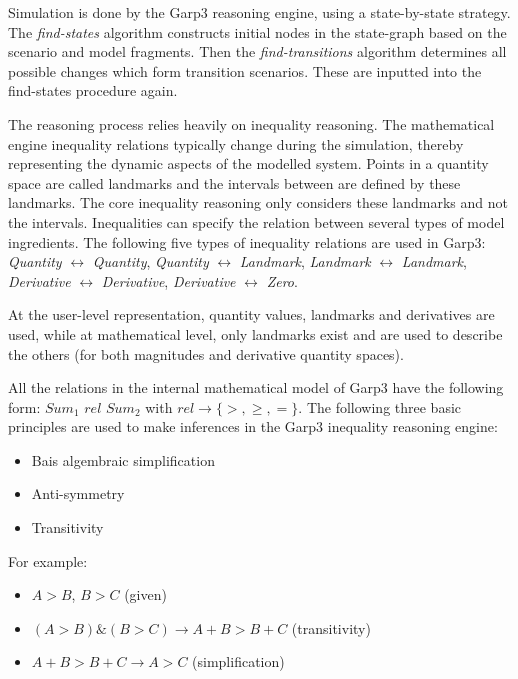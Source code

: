 \documentclass{article} %
\begin{document}
\vspace{0.8em}

Simulation is done by the Garp3 reasoning engine, using a state-by-state
strategy. The \emph{find-states} algorithm constructs initial nodes in the 
state-graph based on the scenario and model fragments. Then the 
\emph{find-transitions} algorithm determines all possible changes which form 
transition scenarios. These are inputted into the find-states procedure again.  

The reasoning process relies heavily on inequality reasoning.
The mathematical engine inequality relations typically change during the 
simulation, thereby representing the dynamic aspects of the modelled system. 
Points in a quantity 
space are called landmarks and the intervals between are defined by these
landmarks. The core inequality reasoning only considers these landmarks and not
the intervals. Inequalities can specify the relation between several types of
model ingredients. The following five types of inequality relations are used in
Garp3: \emph{Quantity} $\leftrightarrow$ \emph{Quantity}, \emph{Quantity} 
$\leftrightarrow$ \emph{Landmark}, \emph{Landmark} $\leftrightarrow$ 
\emph{Landmark}, \emph{Derivative} $\leftrightarrow$ \emph{Derivative}, 
\emph{Derivative} $\leftrightarrow$ \emph{Zero}.  

At the user-level representation, quantity values, landmarks and derivatives are
used, while at mathematical level, only landmarks exist and are used to
describe the others (for both magnitudes and derivative quantity spaces).

All the relations in the internal mathematical model of Garp3 have the
following form: $Sum_1$ $rel$ $Sum_2$ with $rel \rightarrow \{>,\ge,=\}$. The following
three basic principles are used to make inferences in the Garp3 inequality
reasoning engine:

\begin{itemize}
\item Bais algembraic simplification
\item Anti-symmetry
\item Transitivity
\end{itemize}
For example:
\begin{itemize}
\item $A>B$, $B>C$ (given)
\item $(A>B)\&(B>C) \rightarrow A+B>B+C$ (transitivity)
\item $A+B>B+C \rightarrow A>C$ (simplification)
\end{itemize}
\end{document}
